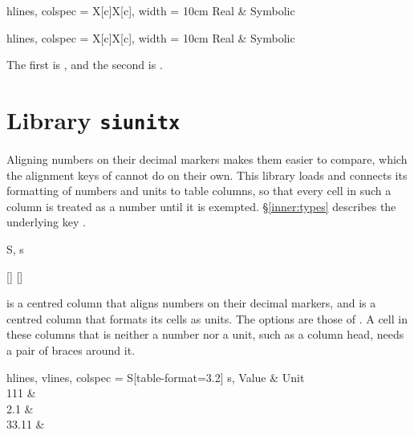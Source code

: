 \begin{codestore}[st=lib:nameref]
    \begin{longtblr}[
        caption = {A caption that is too long for a reference},
        entry = {A short entry},
        label = {tab:nameref:entry},
        ]{hlines, colspec = {X[c]X[c]}, width = 10cm}
        Real & Symbolic
    \end{longtblr}
    \begin{longtblr}[
        caption = {A caption only},
        label = {tab:nameref:caption},
        ]{hlines, colspec = {X[c]X[c]}, width = 10cm}
        Real & Symbolic
    \end{longtblr}
    The first is , and the
    second is .\end{codestore}

\section{Library \texttt{siunitx}}\label{lib:siunitx}
Aligning numbers on their decimal markers makes them easier to compare, which the alignment keys of  cannot do on their own. This library loads  and connects its formatting of numbers and units to table columns, so that every cell in such a column is treated as a number until it is exempted. \S\ref{inner:types} describes the underlying key .

\begin{codedescribe}[
        code,
        new=2021L,
        update=2021M,
        update=2025A
    ]{S, s}
    \begin{codesyntax}
        []
        []
    \end{codesyntax}
     is a centred column that aligns numbers on their decimal markers, and  is a centred column that formats its cells as units. The options are those of . A cell in these columns that is neither a number nor a unit, such as a column head, needs a pair of braces around it.

    \begin{codestore}[st=lib:si:columns]
        \begin{tblr}{
                hlines, vlines,
                colspec = {S[table-format=3.2] s},
            }
            {Value} & {Unit}            \\
            111     & \kilo\metre       \\
            2.1     & \metre\per\second \\
            33.11   & \joule
        \end{tblr}\end{codestore}
    \begin{center}
    \end{center}
\end{codedescribe}

